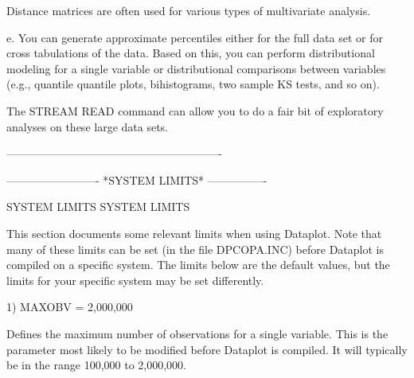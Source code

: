          Distance matrices are often used for various types of
         multivariate analysis.

      e. You can generate approximate percentiles either for the full
         data set or for cross tabulations of the data.  Based on this,
         you can perform distributional modeling for a single variable
         or distributional comparisons between variables (e.g.,
         quantile quantile plots, bihistograms, two sample KS tests, and
         so on).

      The STREAM READ command can allow you to do a fair bit of
      exploratory analyses on these large data sets.  

----------------------------------------------------------


























































-------------------------  *SYSTEM LIMITS*  ----------------
 
SYSTEM LIMITS
SYSTEM LIMITS
 
This section documents some relevant limits when using Dataplot.
Note that many of these limits can be set (in the file DPCOPA.INC)
before Dataplot is compiled on a specific system.  The limits below
are the default values, but the limits for your specific system may
be set differently.


  1) MAXOBV   = 2,000,000

     Defines the maximum number of observations for a single
     variable.  This is the parameter most likely to be modified
     before Dataplot is compiled.  It will typically be in the
     range 100,000 to 2,000,000.

